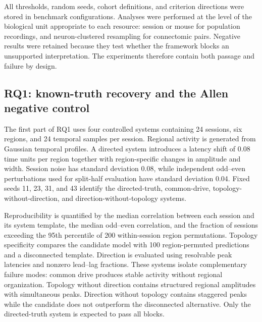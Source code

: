 All thresholds, random seeds, cohort definitions, and criterion directions were
stored in benchmark configurations. Analyses were performed at the level of the
biological unit appropriate to each resource: session or mouse for population
recordings, and neuron-clustered resampling for connectomic pairs. Negative
results were retained because they test whether the framework blocks an
unsupported interpretation. The experiments therefore contain both passage and
failure by design.


\subsection{RQ1: known-truth recovery and the Allen negative control}
\label{subsec:rq1-known-truth-allen}

The first part of RQ1 uses four controlled systems containing 24 sessions, six
regions, and 24 temporal samples per session. Regional activity is generated
from Gaussian temporal profiles. A directed system introduces a latency shift
of 0.08 time units per region together with region-specific changes in amplitude
and width. Session noise has standard deviation 0.08, while independent
odd--even perturbations used for split-half evaluation have standard deviation
0.04. Fixed seeds 11, 23, 31, and 43 identify the directed-truth, common-drive,
topology-without-direction, and direction-without-topology systems.

Reproducibility is quantified by the median correlation between each session
and its system template, the median odd--even correlation, and the fraction of
sessions exceeding the 95th percentile of 200 within-session region
permutations. Topology specificity compares the candidate model with 100
region-permuted predictions and a disconnected template. Direction is evaluated
using resolvable peak latencies and nonzero lead--lag fractions. These systems
isolate complementary failure modes: common drive produces stable activity
without regional organization. Topology without direction contains structured
regional amplitudes with simultaneous peaks. Direction without topology
contains staggered peaks while the candidate does not outperform the
disconnected alternative. Only the directed-truth system is expected to pass
all blocks.

